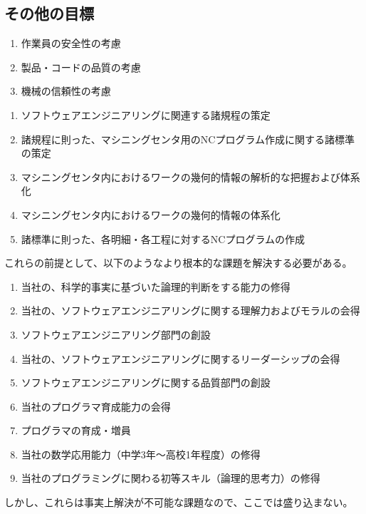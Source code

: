 \subsection{その他の目標}
\begin{enumerate}[label=\sarrow]
\item 作業員の安全性の考慮
\item 製品・コードの品質の考慮
\item 機械の信頼性の考慮
\end{enumerate}



\clearpage
\begin{enumerate}[label=\sarrow]
\item ソフトウェアエンジニアリングに関連する諸規程の策定
\item 諸規程に則った、マシニングセンタ用のNCプログラム作成に関する諸標準の策定
\item マシニングセンタ内におけるワークの幾何的情報の解析的な把握および体系化
\item マシニングセンタ内におけるワークの幾何的情報の体系化
\item 諸標準に則った、各明細・各工程に対するNCプログラムの作成
\end{enumerate}
\begin{hosoku}
これらの前提として、以下のようなより根本的な課題を解決する必要がある。
\begin{enumerate}[label=\sarrow]
\item[{\sarrow[red]}] 当社の、科学的事実に基づいた論理的判断をする能力の修得
\item[{\sarrow[red]}] 当社の、ソフトウェアエンジニアリングに関する理解力およびモラルの会得
\item[{\sarrow[red]}] ソフトウェアエンジニアリング部門の創設
\item[{\sarrow[red]}] 当社の、ソフトウェアエンジニアリングに関するリーダーシップの会得
\item[{\sarrow[red]}] ソフトウェアエンジニアリングに関する品質部門の創設
\item[{\sarrow[red]}] 当社のプログラマ育成能力の会得
\item[{\sarrow[red]}] プログラマの育成・増員
\item[{\sarrow[red]}] 当社の数学応用能力（中学3年～高校1年程度）の修得
\item[{\sarrow[red]}] 当社のプログラミングに関わる初等スキル（論理的思考力）の修得
\end{enumerate}
しかし、これらは事実上解決が不可能な課題なので、ここでは盛り込まない。
\end{hosoku}


